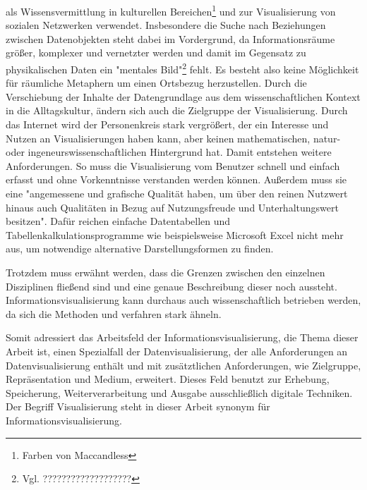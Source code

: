 \documentclass[a4paper, 12pt, DIVcalc, onepage, pdftex, headsepline, footsepline]{scrreprt}
\begin{document}
als Wissensvermittlung in kulturellen Bereichen\footnote{Farben von Maccandless} und zur Visualisierung von
sozialen Netzwerken verwendet.
Insbesondere die Suche nach Beziehungen zwischen Datenobjekten steht dabei im Vordergrund,
da Informationsräume größer, komplexer und vernetzter werden und damit im Gegensatz
zu physikalischen Daten ein "mentales Bild"\footnote{Vgl. ???????????????????} fehlt.
Es besteht also keine Möglichkeit für räumliche Metaphern um einen Ortsbezug herzustellen.
Durch die Verschiebung der Inhalte der Datengrundlage aus dem wissenschaftlichen Kontext
in die Alltagskultur, ändern sich auch die Zielgruppe der Visualisierung. Durch das Internet
wird der Personenkreis stark vergrößert, der ein Interesse und Nutzen an Visualisierungen
haben kann, aber keinen mathematischen, natur- oder ingeneurswissenschaftlichen Hintergrund
hat. Damit entstehen weitere Anforderungen. So muss die Visualisierung vom Benutzer
schnell und einfach erfasst und ohne Vorkenntnisse verstanden werden können.
Außerdem muss sie eine "angemessene und grafische Qualität haben, um über den
reinen Nutzwert hinaus auch Qualitäten in Bezug auf Nutzungsfreude und Unterhaltungswert besitzen".\citep[S.\,438]{Preim}
Dafür reichen einfache Datentabellen und Tabellenkalkulationsprogramme wie beispielsweise Microsoft Excel
nicht mehr aus, um notwendige alternative Darstellungsformen zu finden.

Trotzdem muss erwähnt werden, dass die Grenzen zwischen den einzelnen Disziplinen fließend sind
und eine genaue Beschreibung dieser noch aussteht. Informationsvisualisierung kann durchaus
auch wissenschaftlich betrieben werden, da sich die Methoden und verfahren stark ähneln.

Somit adressiert das Arbeitsfeld der Informationsvisualisierung, die Thema dieser Arbeit ist,
einen Spezialfall der Datenvisualisierung, der alle Anforderungen an Datenvisualisierung enthält
und mit zusätztlichen Anforderungen, wie Zielgruppe, Repräsentation und Medium, erweitert. Dieses
Feld benutzt zur Erhebung, Speicherung, Weiterverarbeitung und Ausgabe ausschließlich digitale Techniken.
Der Begriff Visualisierung steht in dieser Arbeit synonym für Informationsvisualisierung.
\end{document}
